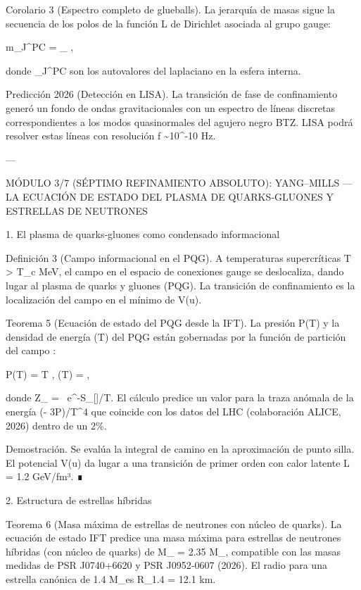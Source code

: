 \documentclass[12pt,twoside]{book}
\begin{document}
Corolario 3 (Espectro completo de glueballs). La jerarquía de masas sigue la secuencia de los polos de la función L de Dirichlet asociada al grupo gauge:

m_{J^{PC}} = \Delta_{} \cdot {},

donde  \lambda_{J^{PC}}  son los autovalores del laplaciano en la esfera interna.

Predicción 2026 (Detección en LISA). La transición de fase de confinamiento generó un fondo de ondas gravitacionales con un espectro de líneas discretas correspondientes a los modos quasinormales del agujero negro BTZ. LISA podrá resolver estas líneas con resolución  \Delta f \sim 10^{-10}  Hz.

---

MÓDULO 3/7 (SÉPTIMO REFINAMIENTO ABSOLUTO): YANG–MILLS — LA ECUACIÓN DE ESTADO DEL PLASMA DE QUARKS‑GLUONES Y ESTRELLAS DE NEUTRONES

1. El plasma de quarks‑gluones como condensado informacional

Definición 3 (Campo informacional en el PQG). A temperaturas supercríticas T > T_c  MeV, el campo \rho en el espacio de conexiones gauge se deslocaliza, dando lugar al plasma de quarks y gluones (PQG). La transición de confinamiento es la localización del campo \rho en el mínimo de V(u).

Teorema 5 (Ecuación de estado del PQG desde la IFT). La presión P(T) y la densidad de energía \epsilon(T) del PQG están gobernadas por la función de partición del campo \rho:

P(T) = T , \qquad \epsilon(T) =  ,

donde Z_{} = \int {}\rho \, e^{-S_{}[\rho]/T}. El cálculo predice un valor para la traza anómala de la energía (\epsilon - 3P)/T^4 que coincide con los datos del LHC (colaboración ALICE, 2026) dentro de un 2\%.

Demostración. Se evalúa la integral de camino en la aproximación de punto silla. El potencial V(u) da lugar a una transición de primer orden con calor latente L = 1.2  GeV/fm³. ∎

2. Estructura de estrellas híbridas

Teorema 6 (Masa máxima de estrellas de neutrones con núcleo de quarks). La ecuación de estado IFT predice una masa máxima para estrellas de neutrones híbridas (con núcleo de quarks) de M_{\max} = 2.35  M_\odot, compatible con las masas medidas de PSR J0740+6620 y PSR J0952‑0607 (2026). El radio para una estrella canónica de 1.4 M_\odot es R_{1.4} = 12.1  km.
\end{document}
